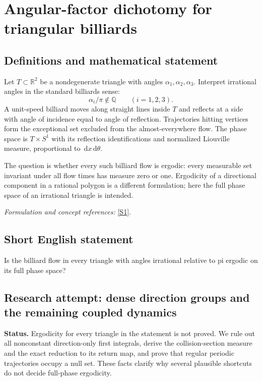 \documentclass[11pt]{article}
\begin{document}
\section*{\texorpdfstring{Angular-factor dichotomy for triangular billiards}{Angular-factor dichotomy for triangular billiards}}\label{statement}
\subsection{Definitions and mathematical statement}
Let $T\subset{\mathbb{R}}^2$ be a nondegenerate triangle with angles $\alpha_1,\alpha_2,\alpha_3$. Interpret irrational angles in the standard billiards sense:
\[
 \alpha_i/\pi\notin{\mathbb{Q}}\qquad(i=1,2,3).
\]
A unit-speed billiard moves along straight lines inside $T$ and reflects at a side with angle of incidence equal to angle of reflection. Trajectories hitting vertices form the exceptional set excluded from the almost-everywhere flow. The phase space is $T\times S^1$ with its reflection identifications and normalized Liouville measure, proportional to ${\,\mathrm{d}} x{\,\mathrm{d}}\theta$.

The question is whether every such billiard flow is ergodic: every measurable set invariant under all flow times has measure zero or one. Ergodicity of a directional component in a rational polygon is a different formulation; here the full phase space of an irrational triangle is intended.
\par\smallskip\textit{Formulation and concept references:} \href{https://aimath.org/WWN/measrigid/measrigid.pdf}{[S1]}.

\subsection{Short English statement}
Is the billiard flow in every triangle with angles irrational relative to pi ergodic on its full phase space?
\subsection{Research attempt: dense direction groups and the remaining coupled dynamics}
\textbf{Status.} Ergodicity for every triangle in the statement is not proved. We rule out all nonconstant direction-only first integrals, derive the collision-section measure and the exact reduction to its return map, and prove that regular periodic trajectories occupy a null set. These facts clarify why several plausible shortcuts do not decide full-phase ergodicity.
\end{document}
